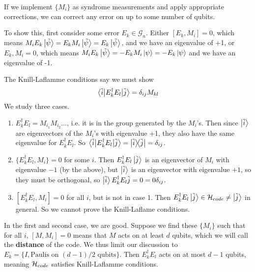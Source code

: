 \begin{theorem}
If we implement $\{M_i\}$ as syndrome measurements and apply appropriate corrections, we can correct any error
on up to some number of qubits.

    To show this, first consider some error $E_k \in \mathcal{G}_n$.
            Either $[E_k, M_i] = 0$, which means $M_i E_k \ket{\tilde{\psi}} = E_k M_i \ket{\tilde{\psi}} = E_k \ket{\tilde{\psi}}$,
            and we have an eigenvalue of +1,
            or ${E_k, M_i} = 0$, which means $M_i E_k \ket{\tilde{\psi}} = - E_k M_i \ket{\psi} = -E_k \ket{\psi}$ and we have an eigenvalue of -1.

            The Knill-Laflamme conditions say we must show
            \[ \mel{\tilde{i}}{E_k^{\dagger} E_{l}}{\tilde{j}} = \delta_{ij} M_{k l} \]
            We study three cases.
            \begin{enumerate}
                \item $E_k^{\dagger} E_{l} = M_{i_1} M_{i_2} \dots$, i.e. it is in the group generated by the $M_{i}$'s. Then
                since $\ket{\tilde{i}}$ are eigenvectors of the $M_i$'s with eigenvalue +1, they also have the same eigenvalue for $E_k^{\dagger} E_{l}$.
                So $\mel{\tilde{i}}{E_k^{\dagger} E_l}{\tilde{j}} = \ketbra{\tilde{i}}{\tilde{j}} = \delta_{ij}$.
                \item $\{E_k^{\dagger} E_l, M_i\} = 0$ for some $i$. Then $E_k^{\dagger} E_l \ket{\tilde{j}}$ is an eigenvector of $M_i$ with eigenvalue $-1$ (by the above),
                but $\ket{\tilde{i}}$ is an eigenvector with eigenvalue $+1$, so they must be orthogonal, so $\ket{\tilde{i}}{E_k^{\dagger} E_l}{\tilde{j}} = 0 = 0 \delta_{ij}$.
                \item $[E_k^{\dagger} E_l, M_i] = 0$ for all $i$, but is not in case 1. Then $E_k^{\dagger} E_l \ket{\tilde{j}} \in \operatorname{\mathcal{H}}_{code} \neq \ket{\tilde{j}}$ in general.
                So we cannot prove the Knill-Laflame conditions.
            \end{enumerate}
    In the first and second case, we are good. Suppose we find these $\{M_i\}$ such that
    for all $i$, $[M, M_i] = 0$ means that $M$ acts on at least $d$ qubits, which we will call the \textbf{distance} of the code.
    We thus limit our discussion to $E_k = \{ I, \text{Paulis on $(d - 1)/2$ qubits} \}$. Then $E_k^{\dagger} E_l$ acts on at most $d - 1$ qubits,
    meaning $\operatorname{\mathcal{H}}_{code}$ satisfies Knill-Laflamme conditions.
\end{theorem}

